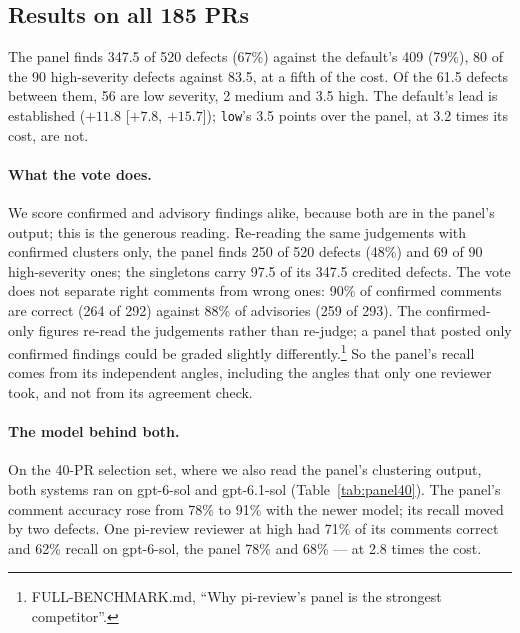\documentclass[11pt,a4paper]{article}
\newcommand{\code}[1]{\texttt{#1}}
\begin{document}
\subsection{Results on all 185 PRs}

The panel finds 347.5 of 520 defects (67\%) against the default's 409
(79\%), 80 of the 90 high-severity defects against 83.5, at a fifth of the
cost. Of the 61.5 defects between them, 56 are low severity, 2 medium and
3.5 high. The default's lead is established ($+11.8$ [$+7.8$, $+15.7$]);
\code{low}'s 3.5 points over the panel, at 3.2 times its cost, are not.

\paragraph{What the vote does.} We score confirmed and advisory findings
alike, because both are in the panel's output; this is the generous reading.
Re-reading the same judgements with confirmed clusters only, the panel finds
250 of 520 defects (48\%) and 69 of 90 high-severity ones; the singletons
carry 97.5 of its 347.5 credited defects. The vote does not separate right
comments from wrong ones: 90\% of confirmed comments are correct (264 of 292)
against 88\% of advisories (259 of 293). The confirmed-only figures re-read
the judgements rather than re-judge; a panel that posted only confirmed
findings could be graded slightly differently.\footnote{FULL-BENCHMARK.md,
``Why pi-review's panel is the strongest competitor''.} So the panel's
recall comes from its independent angles, including the angles that only
one reviewer took, and not from its agreement check.

\paragraph{The model behind both.} On the 40-PR selection set, where we also
read the panel's clustering output, both systems ran on gpt-6-sol and
gpt-6.1-sol (Table~\ref{tab:panel40}). The panel's comment accuracy rose
from 78\% to 91\% with the newer model; its recall moved by two defects.
One pi-review reviewer at high had 71\% of its comments correct and 62\%
recall on gpt-6-sol, the panel 78\% and 68\% --- at 2.8 times the cost.
\end{document}
